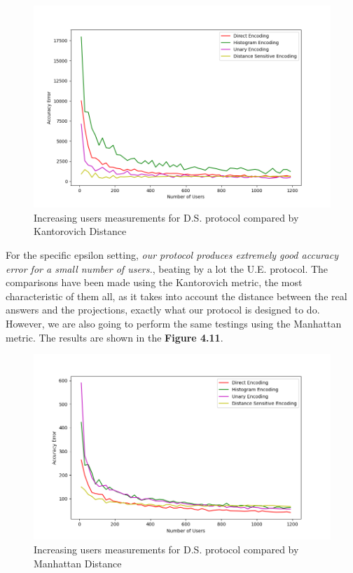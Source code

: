 \begin{figure}[!htb]\centering
    \includegraphics[width=1\textwidth]{images/users_our_kant.png}
    \caption{Increasing users measurements for D.S. protocol compared by Kantorovich Distance}
\end{figure}

For the specific epsilon setting, \emph{our protocol produces extremely good accuracy error for a small number of users.}, beating by a lot the U.E. protocol. The comparisons have been made using the Kantorovich metric, the most characteristic of them all, as it takes into account the distance between the real answers and the projections, exactly what our protocol is designed to do. However, we are also going to perform the same testings using the Manhattan metric. The results are shown in the \textbf{Figure 4.11}.

\begin{figure}[!htb]\centering
    \includegraphics[width=1\textwidth]{images/users_our_l1.png}
    \caption{Increasing users measurements for D.S. protocol compared by Manhattan Distance}
\end{figure}

